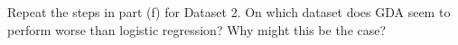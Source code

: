 \clearpage
\item {}
Repeat the steps in part (f) for Dataset 2. On which dataset does GDA seem to
perform worse than logistic regression? Why might this be the case?

\ifnum{}\fi
